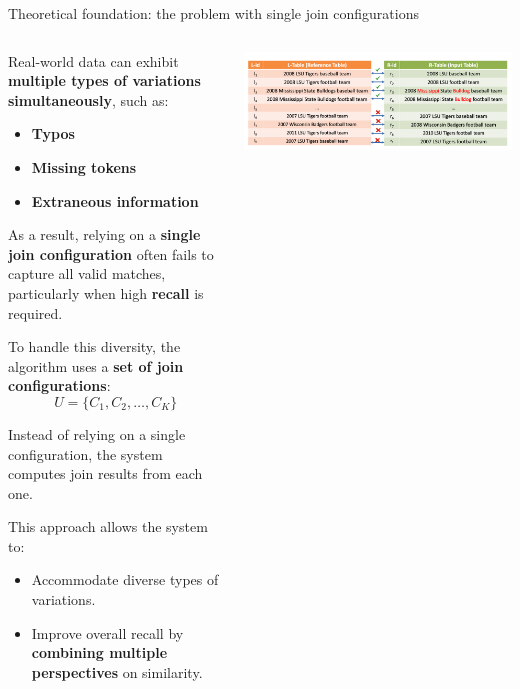 \documentclass[8pt]{beamer} %
\begin{document}
\begin{frame}{Theoretical foundation: the problem with single join configurations}
	
	\begin{columns}
		\begin{column}{0.52\textwidth}
			Real-world data can exhibit \textbf{multiple types of variations simultaneously}, such as:
			\begin{itemize}
				\item \textbf{Typos}
				\item \textbf{Missing tokens}
				\item \textbf{Extraneous information}
			\end{itemize}
			
			As a result, relying on a \textbf{single join configuration} often fails to capture all valid matches, particularly when high \textbf{recall} is required.
			
			\vspace{0.5em}
			To handle this diversity, the algorithm uses a \textbf{set of join configurations}:
			\[
			U = \{C_1, C_2, \dots, C_K\}
			\]
			
			Instead of relying on a single configuration, the system computes join results from each one.
			
			This approach allows the system to:
			\begin{itemize}
				\item Accommodate diverse types of variations.
				\item Improve overall recall by \textbf{combining multiple perspectives} on similarity.
			\end{itemize}
		\end{column}
		
		
		\begin{column}{0.45\textwidth}
			\centering
			\includegraphics[width=\linewidth]{img/Pasted image 20250331152324.png}
			

\end{column}
\end{columns}
\end{frame}
\end{document}

